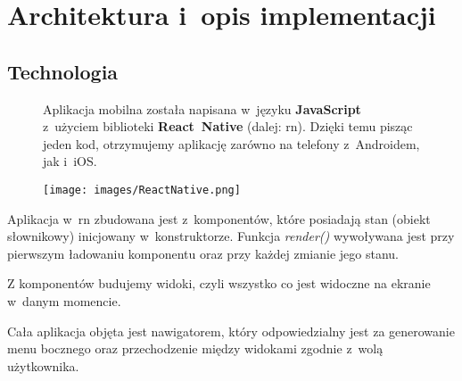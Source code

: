 \section{Architektura i~opis implementacji}

\subsection{Technologia}
\begin{figure}[!htb]
    \centering
    \begin{minipage}{.6\textwidth}
Aplikacja mobilna została napisana w~języku \textbf{JavaScript} z~użyciem biblioteki \textbf{React~Native}\cite{react-native} (dalej: \acrshort{rn}). Dzięki temu pisząc jeden kod, otrzymujemy aplikację zarówno na telefony z~Androidem, jak i~iOS.
    \end{minipage}%
    \begin{minipage}{.4\textwidth}
        \centering
        \texttt{[image: images/ReactNative.png]}\label{RN_logo}
    \end{minipage}
\end{figure}

Aplikacja w~\acrshort{rn} zbudowana jest z~komponentów, które posiadają stan (obiekt słownikowy) inicjowany w~konstruktorze. Funkcja \textit{render()} wywoływana jest przy pierwszym ładowaniu komponentu oraz przy każdej zmianie jego stanu. 

Z komponentów budujemy widoki, czyli wszystko co jest widoczne na ekranie w~danym momencie.

Cała aplikacja objęta jest nawigatorem, który odpowiedzialny jest za generowanie menu bocznego oraz przechodzenie między widokami zgodnie z~wolą użytkownika. \\

